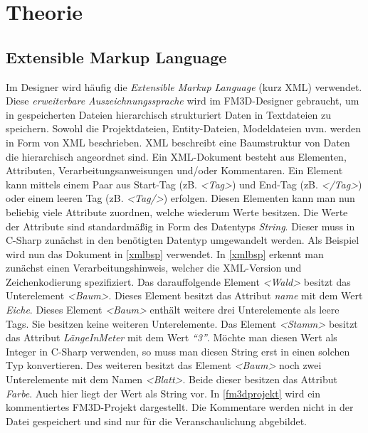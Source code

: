 \chapter{Theorie}
\label{theorie}




\section[Extensible Markup Language]{Extensible Markup Language\cite{xml}\cite{xmlcstutorials}\cite{msdn}}
\label{extensiblemarkuplanguage}

Im Designer wird häufig die \textit{Extensible Markup Language} (kurz \ac{XML}) verwendet.  Diese \textit{erweiterbare Auszeichnungssprache} wird im FM3D-Designer gebraucht, um in gespeicherten Dateien hierarchisch strukturiert Daten in Textdateien zu speichern.
Sowohl die Projektdateien, Entity-Dateien, Modeldateien uvm. werden in Form von \ac{XML} beschrieben. 
\ac{XML} beschreibt eine Baumstruktur von Daten die hierarchisch angeordnet sind. Ein \ac{XML}-Dokument besteht aus Elementen, Attributen, Verarbeitungsanweisungen und/oder Kommentaren. 
Ein Element kann mittels einem Paar aus Start-Tag (zB. \textit{<Tag>}) und End-Tag (zB. \textit{</Tag>}) oder einem leeren Tag (zB. \textit{<Tag/>}) erfolgen.
Diesen Elementen kann man nun beliebig viele Attribute zuordnen, welche wiederum Werte besitzen.
Die Werte der Attribute sind standardmäßig in Form des Datentyps \textit{String}. Dieser muss in C-Sharp zunächst in den benötigten Datentyp umgewandelt werden.
Als Beispiel wird nun das Dokument in \cref{xmlbsp} verwendet. 
In \cref{xmlbsp} erkennt man zunächst einen Verarbeitungshinweis, welcher die XML-Version und Zeichenkodierung spezifiziert. Das darauffolgende Element \textit{<Wald>} besitzt das Unterelement \textit{<Baum>}. Dieses Element besitzt das Attribut \textit{name} mit dem Wert \textit{Eiche}. 
Dieses Element \textit{<Baum>} enthält weitere drei Unterelemente als leere Tags. Sie besitzen keine weiteren Unterelemente. Das Element \textit{<Stamm>} besitzt das Attribut \textit{LängeInMeter} mit dem Wert \textit{"`3"'}. Möchte man diesen Wert als Integer in C-Sharp verwenden, so muss man diesen String erst in einen solchen Typ konvertieren. Des weiteren besitzt das Element \textit{<Baum>} noch zwei Unterelemente mit dem Namen \textit{<Blatt>}. Beide dieser besitzen das Attribut \textit{Farbe}. Auch hier liegt der Wert als String vor.
In \cref{fm3dprojekt} wird ein kommentiertes FM3D-Projekt dargestellt. Die Kommentare werden nicht in der Datei gespeichert und sind nur für die Veranschaulichung abgebildet.
